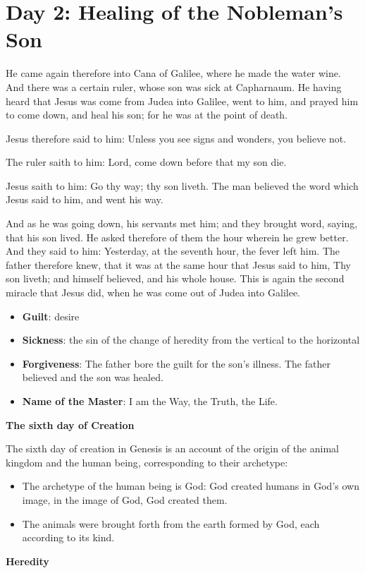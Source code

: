 \section{Day 2: Healing of the Nobleman's Son}

He came again therefore into Cana of Galilee, where he made the water wine. And there was a certain ruler, whose son was sick at Capharnaum. He having heard that Jesus was come from Judea into Galilee, went to him, and prayed him to come down, and heal his son; for he was at the point of death.

Jesus therefore said to him: Unless you see signs and wonders, you believe not.

The ruler saith to him: Lord, come down before that my son die.

Jesus saith to him: Go thy way; thy son liveth. The man believed the word which Jesus said to him, and went his way.

And as he was going down, his servants met him; and they brought word, saying, that his son lived. He asked therefore of them the hour wherein he grew better. And they said to him: Yesterday, at the seventh hour, the fever left him. The father therefore knew, that it was at the same hour that Jesus said to him, Thy son liveth; and himself believed, and his whole house. This is again the second miracle that Jesus did, when he was come out of Judea into Galilee.

\begin{itemize}
\item \textbf{Guilt}: desire 
\item \textbf{Sickness}: the sin of the change of heredity from the vertical to the horizontal 
\item \textbf{Forgiveness}: The father bore the guilt for the son's illness. The father believed
and the son was healed. 
\item \textbf{Name of the Master}: I am the Way, the Truth, the Life. 
\end{itemize}
\textbf{The sixth day of Creation}

The sixth day of creation in Genesis is an account of the origin of the animal kingdom and the human being, corresponding to their archetype:

\begin{itemize}
\item The archetype of the human being is God: God created humans in God's own image, in the image
of God, God created them. 
\item The animals were brought forth from the earth formed by God, each according to its kind. 
\end{itemize}
\textbf{Heredity}

